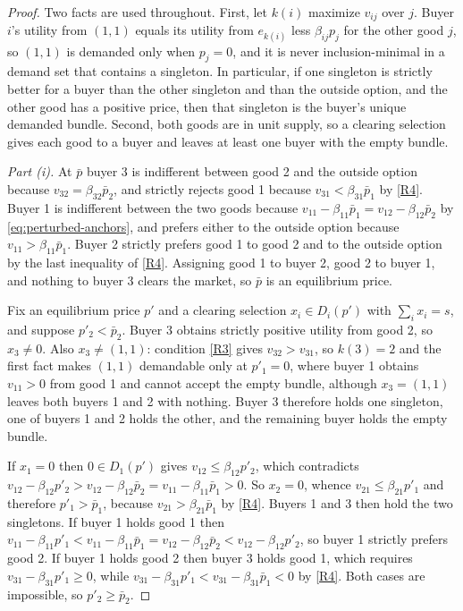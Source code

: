 \documentclass[11pt,a4paper,fleqn]{article}
\theoremstyle{plain}
\theoremstyle{definition}
\begin{document}
\begin{proof}
Two facts are used throughout. First, let $k(i)$ maximize $v_{ij}$ over $j$. Buyer $i$'s utility from $(1,1)$ equals its utility from $e_{k(i)}$ less $\beta_{ij}p_j$ for the other good $j$, so $(1,1)$ is demanded only when $p_j=0$, and it is never inclusion-minimal in a demand set that contains a singleton. In particular, if one singleton is strictly better for a buyer than the other singleton and than the outside option, and the other good has a positive price, then that singleton is the buyer's unique demanded bundle. Second, both goods are in unit supply, so a clearing selection gives each good to a buyer and leaves at least one buyer with the empty bundle.

\emph{Part \textup{(i)}.} At $\bar p$ buyer 3 is indifferent between good 2 and the outside option because $v_{32}=\beta_{32}\bar p_2$, and strictly rejects good 1 because $v_{31}<\beta_{31}\bar p_1$ by \ref{R4}. Buyer 1 is indifferent between the two goods because $v_{11}-\beta_{11}\bar p_1=v_{12}-\beta_{12}\bar p_2$ by \eqref{eq:perturbed-anchors}, and prefers either to the outside option because $v_{11}>\beta_{11}\bar p_1$. Buyer 2 strictly prefers good 1 to good 2 and to the outside option by the last inequality of \ref{R4}. Assigning good 1 to buyer 2, good 2 to buyer 1, and nothing to buyer 3 clears the market, so $\bar p$ is an equilibrium price.

Fix an equilibrium price $p'$ and a clearing selection $x_i\in D_i(p')$ with $\sum_ix_i=s$, and suppose $p'_2<\bar p_2$. Buyer 3 obtains strictly positive utility from good 2, so $x_3\ne0$. Also $x_3\ne(1,1)$: condition \ref{R3} gives $v_{32}>v_{31}$, so $k(3)=2$ and the first fact makes $(1,1)$ demandable only at $p'_1=0$, where buyer 1 obtains $v_{11}>0$ from good 1 and cannot accept the empty bundle, although $x_3=(1,1)$ leaves both buyers 1 and 2 with nothing. Buyer 3 therefore holds one singleton, one of buyers 1 and 2 holds the other, and the remaining buyer holds the empty bundle.

If $x_1=0$ then $0\in D_1(p')$ gives $v_{12}\le\beta_{12}p'_2$, which contradicts $v_{12}-\beta_{12}p'_2>v_{12}-\beta_{12}\bar p_2=v_{11}-\beta_{11}\bar p_1>0$. So $x_2=0$, whence $v_{21}\le\beta_{21}p'_1$ and therefore $p'_1>\bar p_1$, because $v_{21}>\beta_{21}\bar p_1$ by \ref{R4}. Buyers 1 and 3 then hold the two singletons. If buyer 1 holds good 1 then $v_{11}-\beta_{11}p'_1<v_{11}-\beta_{11}\bar p_1=v_{12}-\beta_{12}\bar p_2<v_{12}-\beta_{12}p'_2$, so buyer 1 strictly prefers good 2. If buyer 1 holds good 2 then buyer 3 holds good 1, which requires $v_{31}-\beta_{31}p'_1\ge0$, while $v_{31}-\beta_{31}p'_1<v_{31}-\beta_{31}\bar p_1<0$ by \ref{R4}. Both cases are impossible, so $p'_2\ge\bar p_2$.


\end{proof}
\end{document}
